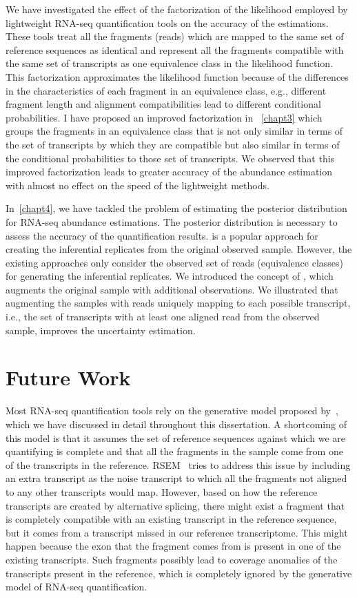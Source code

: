 We have investigated the effect of the factorization of the likelihood employed
by lightweight RNA-seq quantification tools on the accuracy of the estimations. These tools
treat all the fragments (reads) which are mapped to the same set of reference sequences as identical
and represent all the fragments compatible with the same set of transcripts as one equivalence class 
in the likelihood function.
This factorization approximates the likelihood function because of the differences in the
characteristics of each fragment in an equivalence class, e.g., different fragment length and alignment 
compatibilities lead to different conditional probabilities.
I have proposed an improved factorization in ~\cref{chapt3} which groups the fragments
in an equivalence class that is not only similar in terms of the set of transcripts by which they are 
compatible but also similar in terms of the conditional probabilities to those
set of transcripts. We observed that this improved factorization leads to greater accuracy of
the abundance estimation with almost no effect on the speed of the lightweight methods.
 
In~\cref{chapt4}, we have tackled the problem of estimating the posterior distribution for
RNA-seq abundance estimations. The posterior distribution is necessary to assess the accuracy
of the quantification results. \boots is a popular approach for creating the inferential replicates
from the original observed sample. However, the existing \boot approaches only consider the observed
set of reads (equivalence classes) for generating the inferential replicates. We introduced the
concept of \aboots, which augments the original sample with additional observations. We illustrated 
that augmenting the \boot samples with reads uniquely mapping to each possible transcript, i.e., the
set of transcripts with at least one aligned read from the observed sample, improves the uncertainty 
estimation.
 
\section{Future Work}
 
Most RNA-seq quantification tools rely on the generative model proposed by~\cite{Li2010RSEM}, which 
we have discussed in detail throughout this dissertation. A shortcoming of this model is that
it assumes the set of reference sequences against which we are quantifying is complete and that all 
the fragments in the sample come from one of the transcripts in the reference. RSEM~\cite{Li2010RSEM} 
tries to address this issue by including an extra transcript as the noise transcript to which all the 
fragments not aligned to any other transcripts would map. However, based on how the reference transcripts
are created by alternative splicing, there might exist a fragment that is completely compatible with
an existing transcript in the reference sequence, but it comes from a transcript missed in our
reference transcriptome. This might happen because the exon that the fragment comes from is present
in one of the existing transcripts. Such fragments possibly lead to coverage anomalies of the transcripts
present in the reference, which is completely ignored by the generative model of RNA-seq quantification.
 
